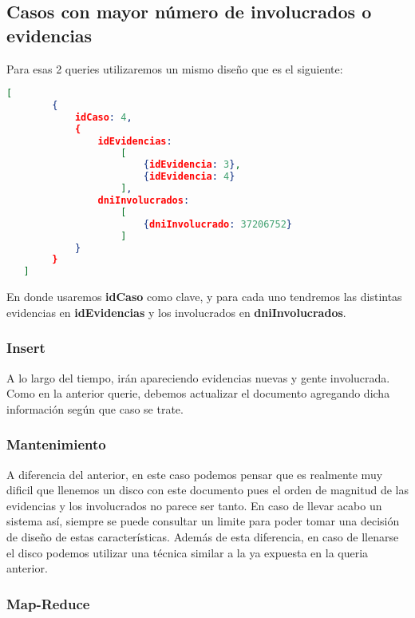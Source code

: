 \documentclass[11pt, a4paper]{article}
\begin{document}
\subsection{Casos con mayor n\'umero de involucrados o evidencias}

Para esas 2 queries utilizaremos un mismo dise\~no que es el siguiente:

\begin{lstlisting}[language=json]
   [
   		{
   			idCaso: 4,
	   		{
	   			idEvidencias: 
	   				[	
	   					{idEvidencia: 3},
	   					{idEvidencia: 4}
	   				],
	   			dniInvolucrados:
	   				[
	   					{dniInvolucrado: 37206752}
	   				]
	   		}
	   	}
   ]
\end{lstlisting}

En donde usaremos \textbf{idCaso} como clave, y para cada uno tendremos las distintas evidencias en \textbf{idEvidencias} y los involucrados en \textbf{dniInvolucrados}.

\subsubsection{Insert}

A lo largo del tiempo, ir\'an apareciendo evidencias nuevas y gente involucrada. Como en la anterior querie, debemos actualizar el documento agregando dicha informaci\'on seg\'un que caso se trate.

\subsubsection{Mantenimiento}

A diferencia del anterior, en este caso podemos pensar que es realmente muy dificil que llenemos un disco con este documento pues el orden de magnitud de las evidencias y los involucrados no parece ser tanto. En caso de llevar acabo un sistema as\'i, siempre se puede consultar un limite para poder tomar una decisi\'on de dise\~no de estas caracter\'isticas. Adem\'as de esta diferencia, en caso de llenarse el disco podemos utilizar una t\'ecnica similar a la ya expuesta en la queria anterior.

\subsubsection{Map-Reduce}
\end{document}
